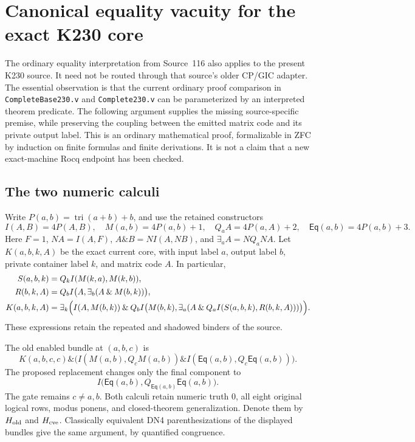 \section{Canonical equality vacuity for the exact K230 core}
\label{sec:canonical-ve-transport}

The ordinary equality interpretation from Source~116 also applies to the
present K230 source.  It need not be routed through that source's older
CP/GIC adapter.  The essential observation is that the current ordinary
proof comparison in \texttt{CompleteBase230.v} and \texttt{Complete230.v}
can be parameterized by an interpreted theorem predicate.  The following
argument supplies the missing source-specific premise, while preserving
the coupling between the emitted matrix code and its private output label.
This is an ordinary mathematical proof, formalizable in ZFC by induction
on finite formulas and finite derivations.  It is not a claim that a new
exact-machine Rocq endpoint has been checked.

\subsection{The two numeric calculi}

Write $P(a,b)=\operatorname{tri}(a+b)+b$, and use the retained constructors
\[
 I(A,B)=4P(A,B),\quad M(a,b)=4P(a,b)+1,\quad
 Q_a A=4P(a,A)+2,\quad \mathsf{Eq}(a,b)=4P(a,b)+3.
\]
Here $F=1$, $N A=I(A,F)$, $A\mathbin{\&}B=N I(A,N B)$, and
$\exists_a A=N Q_a N A$.  Let $K(a,b,k,A)$ be the exact current core,
with input label $a$, output label $b$, private container label $k$,
and matrix code $A$.  In particular,
\begin{align*}
 S(a,b,k)&=Q_k I(M(k,a),M(k,b)),\\
 R(b,k,A)&=Q_b I\bigl(A,\exists_b(A\mathbin{\&}M(b,k))\bigr),\\
 K(a,b,k,A)&=\exists_k\Bigl(
 I(A,M(b,k))\mathbin{\&}
 Q_b I\bigl(M(b,k),\exists_a(A\mathbin{\&}
 Q_a I(S(a,b,k),R(b,k,A)))\bigr)\Bigr).
\end{align*}
These expressions retain the repeated and shadowed binders of the source.

The old enabled bundle at $(a,b,c)$ is
\[
 K(a,b,c,c)\mathbin{\&}
 \bigl(I(M(a,b),Q_cM(a,b))\mathbin{\&}
 I(\mathsf{Eq}(a,b),Q_c\mathsf{Eq}(a,b))\bigr).
\]
The proposed replacement changes only the final component to
\[
 I\bigl(\mathsf{Eq}(a,b),Q_{\mathsf{Eq}(a,b)}\mathsf{Eq}(a,b)\bigr).
 \tag{CVE}
\]
The gate remains $c\ne a,b$.  Both calculi retain numeric truth $0$,
all eight original logical rows, modus ponens, and closed-theorem
generalization.  Denote them by $H_{\rm old}$ and $H_{\rm cve}$.
Classically equivalent DN4 parenthesizations of the displayed bundles
give the same argument, by quantified congruence.

